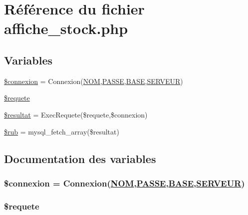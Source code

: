 \hypertarget{materiel_2affiche__stock_8php}{
\section{R\'{e}f\'{e}rence du fichier affiche\_\-stock.php}
\label{materiel_2affiche__stock_8php}
}
\subsection*{Variables}
\begin{CompactItemize}
\item 
\hyperlink{materiel_2affiche__stock_8php_a0}{\$connexion} = Connexion(\hyperlink{pma__connect_8php_a0}{NOM},\hyperlink{pma__connect_8php_a1}{PASSE},\hyperlink{pma__connect_8php_a3}{BASE},\hyperlink{pma__connect_8php_a2}{SERVEUR})
\item 
\hyperlink{materiel_2affiche__stock_8php_a1}{\$requete}
\item 
\hyperlink{materiel_2affiche__stock_8php_a2}{\$resultat} = Exec\-Requete(\$requete,\$connexion)
\item 
\hyperlink{materiel_2affiche__stock_8php_a3}{\$rub} = mysql\_\-fetch\_\-array(\$resultat)
\end{CompactItemize}


\subsection{Documentation des variables}
\hypertarget{materiel_2affiche__stock_8php_a0}{
\subsubsection[\$connexion]{\setlength{\rightskip}{0pt plus 5cm}\$connexion = Connexion(\hyperlink{pma__connect_8php_a0}{NOM},\hyperlink{pma__connect_8php_a1}{PASSE},\hyperlink{pma__connect_8php_a3}{BASE},\hyperlink{pma__connect_8php_a2}{SERVEUR})}}
\label{materiel_2affiche__stock_8php_a0}


\hypertarget{materiel_2affiche__stock_8php_a1}{
\subsubsection[\$requete]{\setlength{\rightskip}{0pt plus 5cm}\$requete}}
\label{materiel_2affiche__stock_8php_a1}


